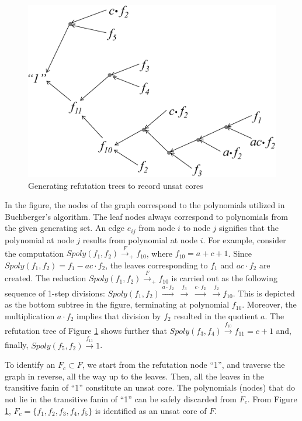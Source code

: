 \begin{figure}[hbt]
\centering
\includegraphics[width=4.5in]{newfig/refutation_tree.eps}
\caption{Generating refutation trees to record unsat cores}
\label{fig:refute}
\end{figure}

In the figure, the nodes of the graph correspond to the polynomials
utilized in Buchberger's algorithm. The leaf nodes always correspond
to polynomials from the given generating set. An edge $e_{ij}$ from
node $i$ to node $j$ signifies that the polynomial at node $j$ results
from polynomial at node $i$. For example, consider the computation
$Spoly(f_1,f_2)\xrightarrow{F}_+ f_{10}$, where $f_{10} = a + c +
1$. Since $Spoly(f_1, f_2) = f_1 - ac\cdot f_2$, the leaves
corresponding to $f_1$ and $ac\cdot f_2$ are created. The reduction
$Spoly(f_1,f_2)\xrightarrow{F}_+ f_{10}$ is carried out as the
following sequence of 1-step divisions:
$Spoly(f_1,f_2)\xrightarrow{a\cdot f_2} ~\xrightarrow{f_3}~
\xrightarrow{c\cdot f_2}  ~\xrightarrow{f_2} f_{10}$. This is depicted
as the bottom subtree in the figure, terminating at polynomial
$f_{10}$. Moreover, the multiplication $a\cdot f_2$ implies that
division by $f_2$ resulted in the quotient $a$. The refutation tree of
Figure  \ref{fig:refute} shows further that
$Spoly(f_3,f_4)\xrightarrow{f_{10}} f_{11} = c+1$ and, finally,
$Spoly(f_5,f_2)\xrightarrow{f_{11}} 1$. 
 
To identify an $F_c \subset F$, we start from the refutation node
``1'', and traverse the graph in reverse, all the way up to the
leaves. Then, all the leaves in the transitive fanin of ``1''
constitute an unsat core. The polynomials (nodes) that do not lie in
the transitive fanin of ``1'' can be safely discarded from $F_c$. From
Figure \ref{fig:refute}, $F_c = \{f_1,f_2,f_3,f_4,f_5\}$ is identified
as an unsat core of $F$. 

